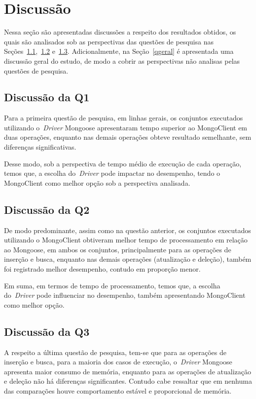 \documentclass[12pt]{article}
\begin{document}
\section{Discussão}
\label{section:discussao}

Nessa seção são apresentadas discussões a respeito dos resultados obtidos, os quais são analisados sob as perspectivas das questões de pesquisa nas Seções~\ref{q1},~\ref{q2} e~\ref{q3}.
Adicionalmente, na Seção~\ref{qgeral} é apresentada uma discussão geral do estudo, de modo a cobrir as perspectivas não analisas pelas questões de pesquisa.

\subsection{Discussão da Q1}
\label{q1}

Para a primeira questão de pesquisa, em linhas gerais, os conjuntos executados utilizando o~\emph{Driver} Mongoose apresentaram tempo superior ao MongoClient em duas operações, enquanto nas demais operações obteve resultado semelhante, sem diferenças significativas.

Desse modo, sob a perspectiva de tempo médio de execução de cada operação, temos que, a escolha do~\emph{Driver} pode impactar no desempenho, tendo o MongoClient como melhor opção sob a perspectiva analisada.

\subsection{Discussão da Q2}
\label{q2}

De modo predominante, assim como na questão anterior, os conjuntos executados utilizando o MongoClient obtiveram melhor tempo de processamento em relação ao Mongoose, em ambos os conjuntos, principalmente para as operações de inserção e busca, enquanto nas demais operações (atualização e deleção), também foi registrado melhor desempenho, contudo em proporção menor.

Em suma, em termos de tempo de processamento, temos que, a escolha do~\emph{Driver} pode influenciar no desempenho, também apresentando MongoClient como melhor opção.

\subsection{Discussão da Q3}
\label{q3}

A respeito a última questão de pesquisa, tem-se que para as operações de inserção e busca, para a maioria dos casos de execução, o~\emph{Driver} Mongoose apresenta maior consumo de memória, enquanto para as operações de atualização e deleção não há diferenças significantes.
Contudo cabe ressaltar que em nenhuma das comparações houve comportamento estável e proporcional de memória.
\end{document}
